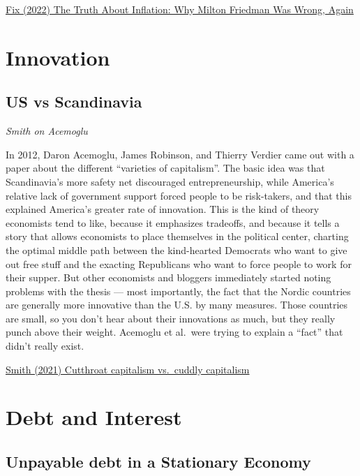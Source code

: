 \documentclass[
]{book}
\begin{document}
\href{https://evonomics.com/the-truth-about-inflation-why-milton-friedman-was-wrong-again/}{Fix (2022) The Truth About Inflation: Why Milton Friedman Was Wrong, Again}

\hypertarget{innovation}{%
\chapter{Innovation}\label{innovation}}

\hypertarget{us-vs-scandinavia}{%
\section{US vs Scandinavia}\label{us-vs-scandinavia}}

\emph{Smith on Acemoglu}

In 2012, Daron Acemoglu, James Robinson, and Thierry Verdier came out with a paper about the different ``varieties of capitalism''. The basic idea was that Scandinavia's more safety net discouraged entrepreneurship, while America's relative lack of government support forced people to be risk-takers, and that this explained America's greater rate of innovation. This is the kind of theory economists tend to like, because it emphasizes tradeoffs, and because it tells a story that allows economists to place themselves in the political center, charting the optimal middle path between the kind-hearted Democrats who want to give out free stuff and the exacting Republicans who want to force people to work for their supper. But other economists and bloggers immediately started noting problems with the thesis --- most importantly, the fact that the Nordic countries are generally more innovative than the U.S. by many measures. Those countries are small, so you don't hear about their innovations as much, but they really punch above their weight. Acemoglu et al.~were trying to explain a ``fact'' that didn't really exist.

\href{https://noahpinion.substack.com/p/cutthroat-capitalism-vs-cuddly-capitalism}{Smith (2021) Cutthroat capitalism vs.~cuddly capitalism}

\hypertarget{debt-and-interest}{%
\chapter{Debt and Interest}\label{debt-and-interest}}

\hypertarget{unpayable-debt-in-a-stationary-economy}{%
\section{Unpayable debt in a Stationary Economy}\label{unpayable-debt-in-a-stationary-economy}}
\end{document}
